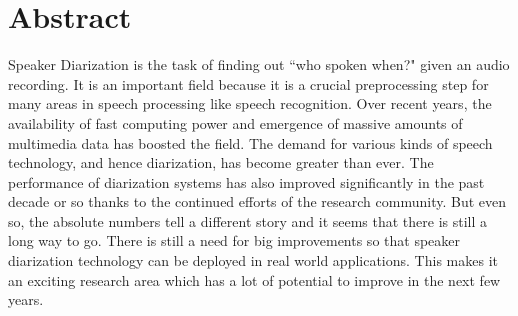 \chapter*{\Large \center Abstract}

Speaker Diarization is the task of finding out ``who spoken when?" given an audio recording. It is an important field because it is a crucial preprocessing step for many areas in speech processing like speech recognition. Over recent years, the availability of fast computing power and emergence of massive amounts of multimedia data has boosted the field. The demand for various kinds of speech technology, and hence diarization, has become greater than ever. The performance of diarization systems has also improved significantly in the past decade or so thanks to the continued efforts of the research community. But even so, the absolute numbers tell a different story and it seems that there is still a long way to go. There is still a need for big improvements so that speaker diarization technology can be deployed in real world applications. This makes it an exciting research area which has a lot of potential to improve in the next few years.

